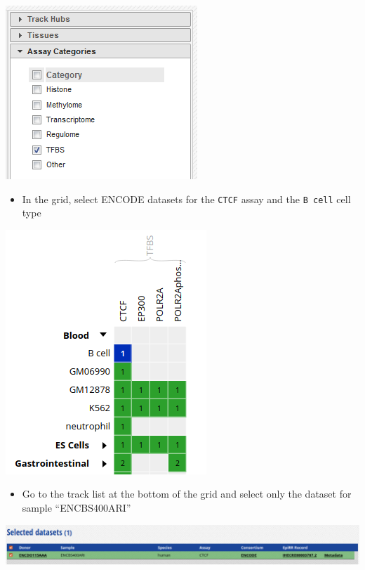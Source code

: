 \documentclass[
]{book}
\providecommand{\tightlist}{%
  \setlength{\itemsep}{0pt}\setlength{\parskip}{0pt}}
\begin{document}
\includegraphics{./img/HOMER_showTFBS.png}

\begin{itemize}
\tightlist
\item
  In the grid, select ENCODE datasets for the \texttt{CTCF} assay and the \texttt{B\ cell} cell type
\end{itemize}

\includegraphics{./img/HOMER_selectCTCF.png}

\begin{itemize}
\tightlist
\item
  Go to the track list at the bottom of the grid and select only the dataset for sample ``ENCBS400ARI''
\end{itemize}

\includegraphics{./img/HOMER_selectPeaksTrack.png}
\end{document}
